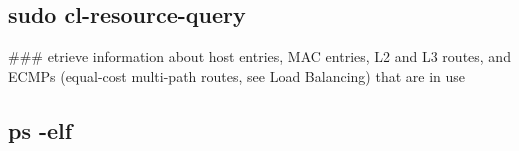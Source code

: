 \subsection*{sudo cl-\/resource-\/query}

\#\#\# etrieve information about host entries, M\+AC entries, L2 and L3 routes, and E\+C\+M\+Ps (equal-\/cost multi-\/path routes, see Load Balancing) that are in use 
\begin{DoxyCode}{0}
\end{DoxyCode}
 
\begin{DoxyCode}{0}
\DoxyCodeLine{}
\DoxyCodeLine{}
\end{DoxyCode}
 \subsection*{ps -\/elf}

